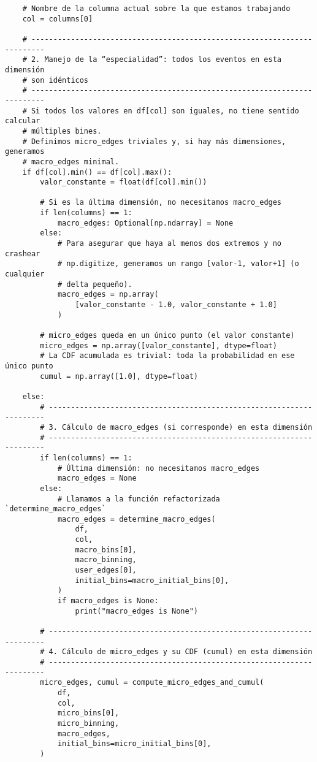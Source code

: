 \begin{verbatim}
    # Nombre de la columna actual sobre la que estamos trabajando
    col = columns[0]

    # -------------------------------------------------------------------------
    # 2. Manejo de la “especialidad”: todos los eventos en esta dimensión 
    # son idénticos
    # -------------------------------------------------------------------------
    # Si todos los valores en df[col] son iguales, no tiene sentido calcular 
    # múltiples bines.
    # Definimos micro_edges triviales y, si hay más dimensiones, generamos 
    # macro_edges minimal.
    if df[col].min() == df[col].max():
        valor_constante = float(df[col].min())

        # Si es la última dimensión, no necesitamos macro_edges
        if len(columns) == 1:
            macro_edges: Optional[np.ndarray] = None
        else:
            # Para asegurar que haya al menos dos extremos y no crashear 
            # np.digitize, generamos un rango [valor-1, valor+1] (o cualquier 
            # delta pequeño).
            macro_edges = np.array(
                [valor_constante - 1.0, valor_constante + 1.0]
            )

        # micro_edges queda en un único punto (el valor constante)
        micro_edges = np.array([valor_constante], dtype=float)
        # La CDF acumulada es trivial: toda la probabilidad en ese único punto
        cumul = np.array([1.0], dtype=float)

    else:
        # ---------------------------------------------------------------------
        # 3. Cálculo de macro_edges (si corresponde) en esta dimensión
        # ---------------------------------------------------------------------
        if len(columns) == 1:
            # Última dimensión: no necesitamos macro_edges
            macro_edges = None
        else:
            # Llamamos a la función refactorizada `determine_macro_edges`
            macro_edges = determine_macro_edges(
                df,
                col,
                macro_bins[0],
                macro_binning,
                user_edges[0],
                initial_bins=macro_initial_bins[0],
            )
            if macro_edges is None:
                print("macro_edges is None")

        # ---------------------------------------------------------------------
        # 4. Cálculo de micro_edges y su CDF (cumul) en esta dimensión
        # ---------------------------------------------------------------------
        micro_edges, cumul = compute_micro_edges_and_cumul(
            df,
            col,
            micro_bins[0],
            micro_binning,
            macro_edges,
            initial_bins=micro_initial_bins[0],
        )


\end{verbatim}
